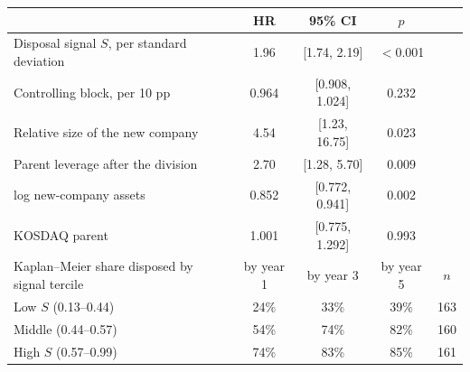\begin{tabular}{lcccc}
\toprule
 & HR & 95\% CI & $p$ & \\
\midrule
Disposal signal $S$, per standard deviation & 1.96 & [1.74, 2.19] & $<$0.001 & \\
Controlling block, per 10 pp & 0.964 & [0.908, 1.024] & 0.232 & \\
Relative size of the new company & 4.54 & [1.23, 16.75] & 0.023 & \\
Parent leverage after the division & 2.70 & [1.28, 5.70] & 0.009 & \\
log new-company assets & 0.852 & [0.772, 0.941] & 0.002 & \\
KOSDAQ parent & 1.001 & [0.775, 1.292] & 0.993 & \\
\midrule
Kaplan--Meier share disposed by signal tercile & by year 1 & by year 3 & by year 5 & $n$ \\
\midrule
Low $S$ (0.13--0.44) & 24\% & 33\% & 39\% & 163 \\
Middle (0.44--0.57) & 54\% & 74\% & 82\% & 160 \\
High $S$ (0.57--0.99) & 74\% & 83\% & 85\% & 161 \\
\bottomrule
\end{tabular}
